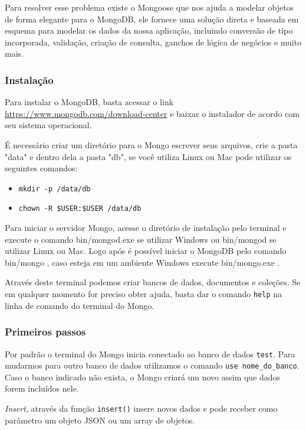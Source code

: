 \documentclass[
	12pt,				%
	openright,			%
	twoside,			%
	a4paper,			%
	english,			%
	brazil				%
	]{abntex2}
\begin{document}
Para resolver esse problema existe o Mongoose que nos ajuda a modelar objetos de forma elegante para o MongoDB, ele fornece uma solução direta e baseada em esquema para modelar os dados da nossa aplicação, incluindo conversão de tipo incorporada, validação, criação de consulta, ganchos de lógica de negócios e muito mais.

\subsubsection{Instalação}

Para instalar o MongoDB, basta acessar o link \url{https://www.mongodb.com/download-center} e baixar o instalador de acordo com seu sistema operacional.

É necessário criar um diretório para o Mongo escrever seus arquivos, crie a pasta "data" e dentro dela a pasta "db", se você utiliza Linux ou Mac pode utilizar os seguintes comandos:

\begin{itemize}
\item \verb|mkdir -p /data/db|
\item \verb|chown -R $USER:$USER /data/db|
\end{itemize}

Para iniciar o servidor Mongo, acesse o diretório de instalação pelo terminal e execute o comando bin/mongod.exe se utilizar Windows ou bin/mongod se utilizar Linux ou Mac. Logo após é possível iniciar o MongoDB pelo comando bin/mongo , caso esteja em um ambiente Windows execute bin/mongo.exe .

Através deste terminal podemos criar bancos de dados, documentos e coleções. Se em qualquer momento for preciso obter ajuda, basta dar o comando \verb|help| na linha de comando do terminal do Mongo.

\subsubsection{Primeiros passos}

Por padrão o terminal do Mongo inicia conectado ao banco de dados \verb|test|. Para mudarmos para outro banco de dados utilizamos o comando \verb|use nome_do_banco|. Caso o banco indicado não exista, o Mongo criará um novo assim que dados forem incluídos nele.

\textit{Insert}, através da função \verb|insert()| insere novos dados e pode receber como parâmetro um objeto JSON ou um array de objetos.
\end{document}

